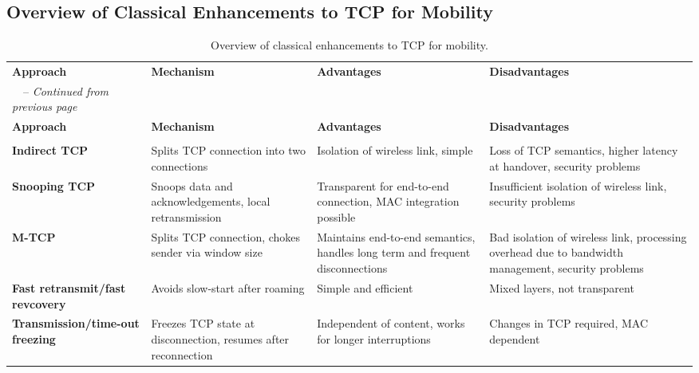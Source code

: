 \begin{landscape}
	\section[Classical Enhancements to TCP]{Overview of Classical Enhancements to TCP for Mobility}
	
\begin{longtable}[ht!]{@{}>{\raggedright\arraybackslash}p{3cm}>{\raggedright\arraybackslash}p{4.1cm}>{\raggedright\arraybackslash}p{4.1cm}>{\raggedright\arraybackslash}p{4.1cm}@{}}
	\caption{Overview of classical enhancements to TCP for mobility.}{\label{tab:classical_enhancments_tcp}} \\
	
	\toprule
	\textbf{Approach} & \textbf{Mechanism} & \textbf{Advantages} & \textbf{Disadvantages}\\
	\midrule
	
	\endfirsthead
	\multicolumn{2}{c}%
	{\tablename\ \thetable\ -- \textit{Continued from previous page}} \\
	
	\hline
	\textbf{Approach} & \textbf{Mechanism} & \textbf{Advantages} & \textbf{Disadvantages}\\
	\hline
	\endhead \hline
	\multicolumn{4}{r}{\textit{Continued on next page $\ldots$}} \\
	\endfoot
	\endlastfoot
	
	\textbf{Indirect TCP} & Splits TCP connection into two connections & Isolation of wireless link, simple & Loss of TCP semantics, higher latency at handover, security problems \tabularnewline
	
	\textbf{Snooping TCP} & Snoops data and acknowledgements, local retransmission & Transparent for end-to-end connection, MAC integration possible & Insufficient isolation of wireless link, security problems \tabularnewline
	

	\textbf{M-TCP} & Splits TCP connection, chokes sender via window size & Maintains end-to-end semantics, handles long term and frequent disconnections & Bad isolation of
	wireless link, processing overhead due to bandwidth management, security problems \tabularnewline


	\textbf{Fast retransmit/fast revcovery} & Avoids slow-start after roaming & Simple and
	efficient & Mixed layers, not transparent \tabularnewline


	\textbf{Transmission/time-out freezing} & Freezes TCP state at disconnection, resumes after reconnection & Independent of content, works for longer interruptions & Changes in TCP required, MAC dependent \tabularnewline


\end{longtable}
\end{landscape}

